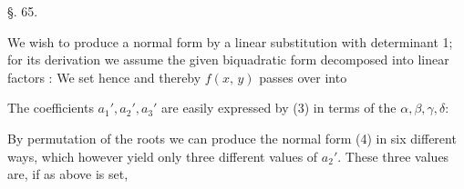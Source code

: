 
\begin{center}
§. 65.

\end{center}

We wish to produce a normal form by a linear substitution
with determinant 1; for its derivation we assume the
given biquadratic form decomposed into linear factors
:
We set
hence
and thereby $f(x,\,y)$ passes over into

The coefficients $a_1', a_2', a_3'$ are easily expressed by (3) in terms of the
$\alpha, \beta, \gamma, \delta$:

By permutation of the roots we can produce the normal form
 (4) in six different ways, which however yield only
three different values of $a_2'$. These three values
are, if as above
is set,
